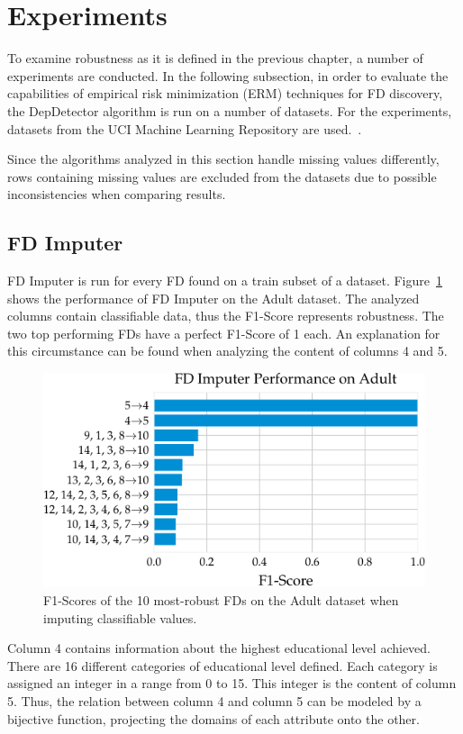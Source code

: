 \newpage
\section{Experiments}
To examine robustness as it is defined in the previous chapter, a number of experiments are conducted.
In the following subsection, in order to evaluate the capabilities of empirical risk minimization (ERM) techniques for FD discovery, the DepDetector algorithm is run on a number of datasets.
For the experiments, datasets from the UCI Machine Learning Repository are used.~\cite{DUA19}.

Since the algorithms analyzed in this section handle missing values differently, rows containing missing values are excluded from the datasets due to possible inconsistencies when comparing results.

\subsection{FD Imputer}
FD Imputer is run for every FD found on a train subset of a dataset.
Figure~\ref{fig:f1_fd_adult} shows the performance of FD Imputer on the Adult dataset.
The analyzed columns contain classifiable data, thus the F1-Score represents robustness.
The two top performing FDs have a perfect F1-Score of 1 each.
An explanation for this circumstance can be found when analyzing the content of columns 4 and 5.

\begin{figure}[ht]
     \centering
     \includegraphics[width=.8\textwidth]{../figures/adult/f1_fd_imputer_adult.pdf}
     \caption{F1-Scores of the 10 most-robust FDs on the Adult dataset when imputing classifiable values.}
     \label{fig:f1_fd_adult}
\end{figure}

Column 4 contains information about the highest educational level achieved.
There are 16 different categories of educational level defined.
Each category is assigned an integer in a range from 0 to 15.
This integer is the content of column 5.
Thus, the relation between column 4 and column 5 can be modeled by a bijective function, projecting the domains of each attribute onto the other.

